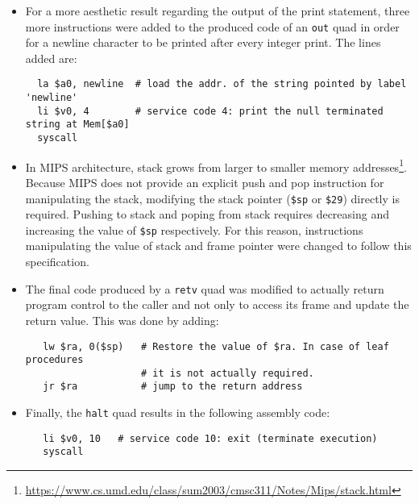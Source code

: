 \documentclass{article}
\def\code#1{\texttt{#1}} %
\begin{document}
\begin{itemize}
 \item For a more aesthetic result regarding the output of the print statement, three more instructions
       were added to the produced code of an \code{out} quad in order for a newline character to be printed
       after every integer print. The lines added are:
  \begin{lstlisting}
  la $a0, newline  # load the addr. of the string pointed by label 'newline'
  li $v0, 4        # service code 4: print the null terminated string at Mem[$a0]
  syscall
  \end{lstlisting}
 \item In MIPS architecture, stack grows from larger to smaller memory
       addresses\footnote{\url{https://www.cs.umd.edu/class/sum2003/cmsc311/Notes/Mips/stack.html}}.
       Because MIPS does not provide an explicit push and pop instruction for manipulating the stack,
       modifying the stack pointer (\verb|$sp| or \verb|$29|) directly is required. Pushing to stack
       and poping from stack requires decreasing and increasing the value of \verb|$sp| respectively.
       For this reason, instructions manipulating the value of stack and frame pointer were changed
       to follow this specification.
 \item The final code produced by a \code{retv} quad was modified to actually return
       program control to the caller and not only to access its frame and update the return value.
       This was done by adding:
  \begin{lstlisting}
   lw $ra, 0($sp)   # Restore the value of $ra. In case of leaf procedures
                    # it is not actually required.
   jr $ra           # jump to the return address
  \end{lstlisting}
 \item Finally, the \code{halt} quad results in the following assembly code:
 \begin{lstlisting}
   li $v0, 10   # service code 10: exit (terminate execution)
   syscall
  \end{lstlisting}
\end{itemize}
\end{document}

